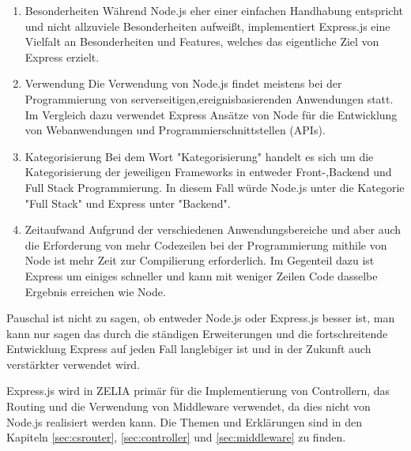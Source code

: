 \begin{enumerate}
    \item Besonderheiten
    \newline
    Während Node.js eher einer einfachen Handhabung entspricht und nicht allzuviele Besonderheiten aufweißt, implementiert Express.js eine Vielfalt an Besonderheiten und Features, welches das eigentliche Ziel von Express erzielt. 
    \item Verwendung
    \newline
    Die Verwendung von Node.js findet meistens bei der Programmierung von serverseitigen,ereignisbasierenden Anwendungen statt. Im Vergleich dazu verwendet Express Ansätze von Node für die Entwicklung von Webanwendungen und Programmierschnittstellen (APIs).
    \item Kategorisierung
    \newline
    Bei dem Wort "Kategorisierung" handelt es sich um die Kategorisierung der jeweiligen Frameworks in entweder Front-,Backend und Full Stack Programmierung. In diesem Fall würde Node.js unter die Kategorie "Full Stack" und Express unter "Backend".
    \item Zeitaufwand
    \newline
    Aufgrund der verschiedenen Anwendungsbereiche und aber auch die Erforderung von mehr Codezeilen bei der Programmierung mithile von Node ist mehr Zeit zur Compilierung erforderlich. Im Gegenteil dazu ist Express um einiges schneller und kann mit weniger Zeilen Code dasselbe Ergebnis erreichen wie Node.
\end{enumerate} \cite{NodeExp}

Pauschal ist nicht zu sagen, ob entweder Node.js oder Express.js besser ist, man kann nur sagen das durch die ständigen Erweiterungen und die fortschreitende Entwicklung Express auf jeden Fall langlebiger ist und in der Zukunft auch verstärkter verwendet wird. \cite{NodeExp}

Express.js wird in ZELIA primär für die Implementierung von Controllern, das Routing und die Verwendung von Middleware verwendet, da dies nicht von Node.js realisiert werden kann. Die Themen und Erklärungen sind in den Kapiteln \ref{sec:csrouter}, \ref{sec:controller} und \ref{sec:middleware} zu finden. \cite{NodeExp}